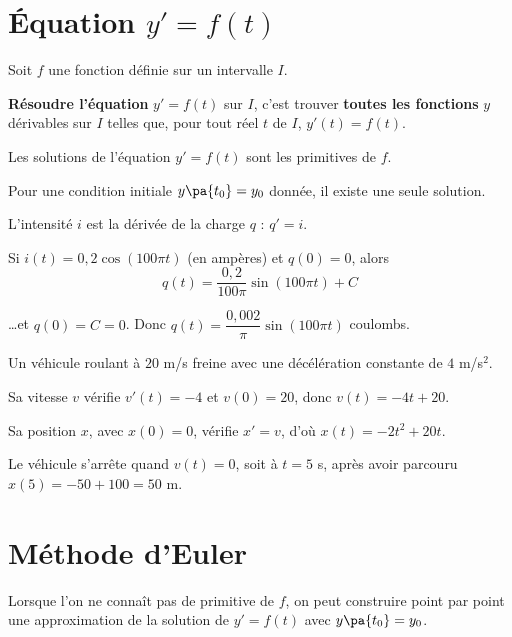 \section{Équation $y' = f(t)$}

\begin{defin}
	Soit $f$ une fonction définie sur un intervalle $I$.

	\textbf{Résoudre l'équation} $y' = f(t)$ sur $I$, c'est trouver \textbf{toutes les fonctions} $y$ dérivables sur $I$ telles que, pour tout réel $t$ de $I$, $y'(t) = f(t)$.
\end{defin}

\begin{prop}
	Les solutions de l'équation $y' = f(t)$ sont les primitives de $f$.

	Pour une condition initiale $y\pa{t_0} = y_0$ donnée, il existe une seule solution.
\end{prop}

\begin{ex}

	L'intensité $i$ est la dérivée de la charge $q$ : $q' = i$.

	Si $i(t) = 0{,}2\cos(100\pi t)$ (en ampères) et $q(0) = 0$, alors
	\[
		q(t) = \dfrac{0{,}2}{100\pi}\sin(100\pi t) + C
	\]

	\ldots et $q(0) = C = 0$. Donc $q(t) = \dfrac{0{,}002}{\pi}\sin(100\pi t)$ coulombs.
\end{ex}

\begin{ex}[Freinage]

	Un véhicule roulant à $20$ m/s freine avec une décélération constante de $4$ m/s$^2$.

	Sa vitesse $v$ vérifie $v'(t) = -4$ et $v(0) = 20$, donc $v(t) = -4t + 20$.

	Sa position $x$, avec $x(0) = 0$, vérifie $x' = v$, d'où $x(t) = -2t^2 + 20t$.

	Le véhicule s'arrête quand $v(t) = 0$, soit à $t = 5$ s, après avoir parcouru $x(5) = -50 + 100 = 50$ m.
\end{ex}

\section{Méthode d'Euler}

Lorsque l'on ne connaît pas de primitive de $f$, on peut construire point par point une approximation de la solution de $y' = f(t)$ avec $y\pa{t_0} = y_0$.

